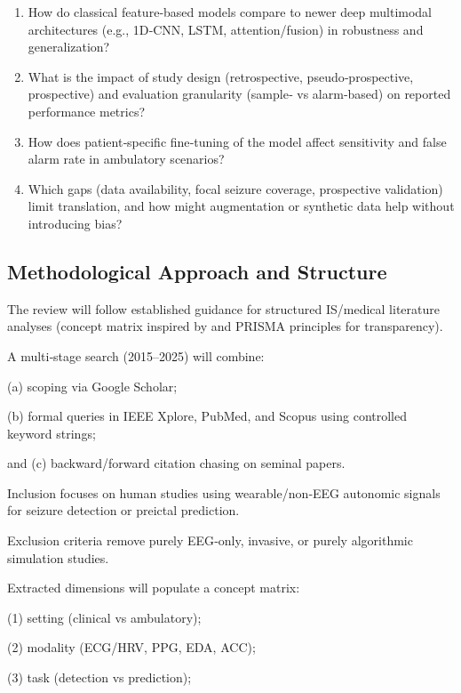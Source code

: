 \begin{enumerate}
    \item How do classical feature‑based models compare to newer deep multimodal architectures
    (e.g., 1D‑CNN, LSTM, attention/fusion) in robustness and generalization?

    \item What is the impact of study design (retrospective, pseudo‑prospective, prospective)
    and evaluation granularity (sample‑ vs alarm‑based) on reported performance metrics?

    \item How does patient‑specific fine‑tuning of the model affect sensitivity and false
    alarm rate in ambulatory scenarios?

    \item Which gaps (data availability, focal seizure coverage, prospective validation)
    limit translation, and how might augmentation or synthetic data help without
    introducing bias?
\end{enumerate}

\subsection{Methodological Approach and Structure}

The review will follow established guidance for structured IS/medical literature analyses
(concept matrix inspired by \cite{websterAnalyzingPastDetermine2002} and PRISMA principles
for transparency).

A multi‑stage search (2015--2025) will combine:

(a) scoping via Google Scholar;

(b) formal queries in IEEE Xplore, PubMed, and Scopus using controlled keyword strings;

and (c) backward/forward citation chasing on seminal papers.

Inclusion focuses on human studies using wearable/non‑EEG autonomic signals for seizure
detection or preictal prediction.

Exclusion criteria remove purely EEG‑only, invasive, or purely algorithmic
simulation studies.

Extracted dimensions will populate a concept matrix:

(1) setting (clinical vs ambulatory);

(2) modality (ECG/HRV, PPG, EDA, ACC);

(3) task (detection vs prediction);

